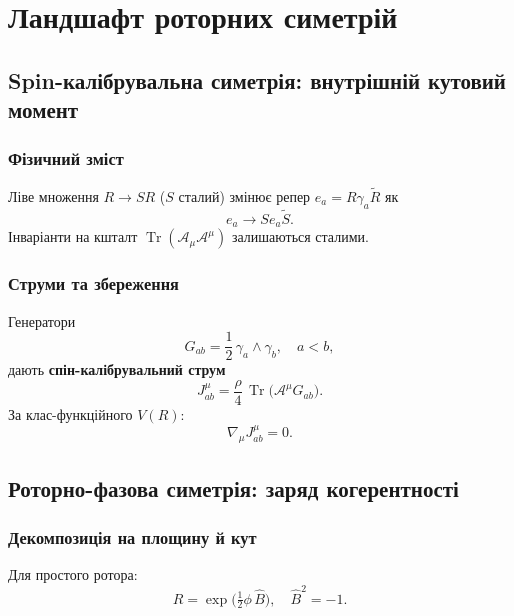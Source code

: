 \documentclass[11pt,a4paper]{article}
\numberwithin{equation}{section}
\theoremstyle{plain}
\theoremstyle{definition}
\theoremstyle{remark}
\DeclareMathOperator{\Tr}{Tr}
\begin{document}
\section{Ландшафт роторних симетрій}
\label{sec:catalog}

\subsection{Spin-калібрувальна симетрія: внутрішній кутовий момент}

\subsubsection{Фізичний зміст}

Ліве множення $R\to SR$ ($S$ сталий) змінює репер $e_a=R\gamma_a\widetilde{R}$ як
\begin{equation}
e_a \to Se_a\widetilde{S}.
\end{equation}
Інваріанти на кшталт $\Tr(\mathcal{A}_\mu\mathcal{A}^\mu)$ залишаються сталими.

\subsubsection{Струми та збереження}

Генератори
\begin{equation}
G_{ab} = \frac{1}{2}\,\gamma_a\wedge\gamma_b, \quad a<b,
\end{equation}
дають \textbf{спін-калібрувальний струм}
\begin{equation}
J^{\mu}_{ab} = \frac{\rho}{4}\,\Tr\!\big(\mathcal{A}^\mu G_{ab}\big).
\label{eq:spin-current}
\end{equation}
За клас-функційного $V(R)$:
\begin{equation}
\nabla_\mu J^{\mu}_{ab} = 0.
\label{eq:spin-conserved}
\end{equation}

\subsection{Роторно-фазова симетрія: заряд когерентності}

\subsubsection{Декомпозиція на площину й кут}

Для простого ротора:
\begin{equation}
R = \exp\!\big(\tfrac{1}{2}\phi\,\hat{B}\big),\quad \hat{B}^2=-1.
\end{equation}
\end{document}
